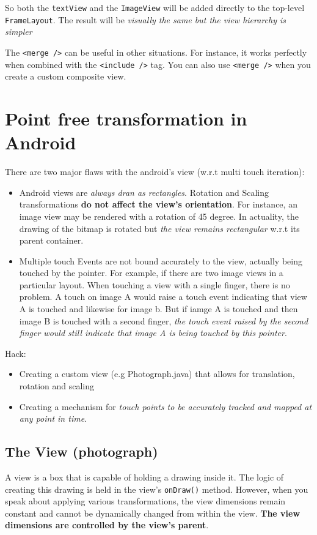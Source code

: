 \documentclass[11pt, a4paper]{book}
\begin{document}
So both the \verb|textView| and the \verb|ImageView| will be added directly to
the top-level \verb|FrameLayout|. The result will be \emph{visually the same but
the view hierarchy is simpler}

The \verb|<merge />| can be useful in other situations. For instance, it works
perfectly when combined with the \verb|<include />| tag. You can also use
\verb|<merge />| when you create a custom composite view.
\chapter{Point free transformation in Android}
There are two major flaws with the android's view (w.r.t multi touch iteration):
\begin{itemize}
\item Android views are \emph{always dran as rectangles}. Rotation and Scaling
transformations \textbf{do not affect the view's orientation}. For instance, an
image view may be rendered with a rotation of 45 degree. In actuality, the
drawing of the bitmap is rotated but \emph{the view remains rectangular} w.r.t
its parent container.
\item Multiple touch Events are not bound accurately to the view, actually being
touched by the pointer. For example, if there are two image views in a
particular layout. When touching a view with a single finger, there is no
problem. A touch on image A would raise a touch event indicating that view A is
touched and likewise for image b. But if iamge A is touched and then image B is
touched with a second finger, \emph{the touch event raised by the second finger
would still indicate that image A is being touched by this pointer}. 
\end{itemize}
Hack:
\begin{itemize}
\item Creating a custom view (e.g Photograph.java) that allows for translation,
rotation and scaling
\item Creating a mechanism for \emph{touch points to be accurately tracked and
mapped at any point in time}.
\end{itemize}
\section{The View (photograph)}
A view is a box that is capable of holding a drawing inside it. The logic of
creating this drawing is held in the view's \verb|onDraw()| method. However,
when you speak about applying various transformations, the view dimensions
remain constant and cannot be dynamically changed from within the view.
\textbf{The view dimensions are controlled by the view's parent}.
\end{document}
